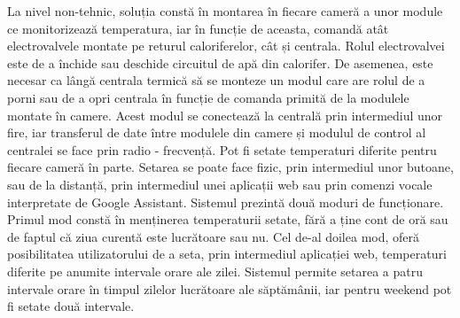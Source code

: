	La nivel non-tehnic, soluția constă în montarea în fiecare cameră a unor module ce monitorizează temperatura, iar în funcție de aceasta, comandă atât electrovalvele montate pe returul caloriferelor, cât și centrala. Rolul electrovalvei este de a închide sau deschide circuitul de apă din calorifer. De asemenea, este necesar ca lângă centrala termică să se monteze un modul care are rolul de a porni sau de a opri centrala în funcție de comanda primită de la modulele montate în camere. Acest modul se conectează la centrală prin intermediul unor fire, iar transferul de date între modulele din camere și modulul de control al centralei se face prin radio - frecvență. Pot fi setate temperaturi diferite pentru fiecare cameră în parte. Setarea se poate face fizic, prin intermediul unor butoane, sau de la distanță, prin intermediul unei aplicații web sau prin comenzi vocale interpretate de Google Assistant. Sistemul prezintă două moduri de funcționare. Primul mod constă în menținerea temperaturii setate, fără a ține cont de oră sau de faptul că ziua curentă este lucrătoare sau nu. Cel de-al doilea mod, oferă posibilitatea utilizatorului de a seta, prin intermediul aplicației web, temperaturi diferite pe anumite intervale orare ale zilei. Sistemul permite setarea a patru intervale orare în timpul zilelor lucrătoare ale săptămânii, iar pentru weekend pot fi setate două intervale.
